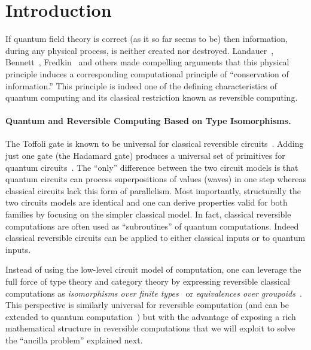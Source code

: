 \documentclass[sigplan,10pt,review,anonymous]{acmart}
\begin{document}






\section{Introduction}

If quantum field theory is correct (as it so far seems to be) then
information, during any physical process, is neither created nor
destroyed. Landauer~\cite{Landauer:1961,Landauer,bennett1985fundamental},
Bennett~\cite{bennett2010notes,bennett2003notes,Bennett:1973:LRC},
Fredkin~\cite{fredkin1982conservative} and others made compelling
arguments that this physical principle induces a corresponding
computational principle of ``conservation of information.'' This
principle is indeed one of the defining characteristics of quantum
computing and its classical restriction known as reversible computing.

\paragraph*{Quantum and Reversible Computing Based on Type
  Isomorphisms.} The Toffoli gate is known to be universal for
classical reversible circuits~\cite{Toffoli:1980}. Adding just one
gate (the Hadamard gate) produces a universal set of primitives for
quantum circuits~\cite{hadtoffuniv}. The ``only'' difference between
the two circuit models is that quantum circuits can process
superpositions of values (waves) in one step whereas classical
circuits lack this form of parallelism. Most importantly, structurally
the two circuits models are identical and one can derive properties
valid for both families by focusing on the simpler classical model. In
fact, classical reversible computations are often used as
``subroutines'' of quantum computations. Indeed classical reversible
circuits can be applied to either classical inputs or to quantum
inputs. 

Instead of using the low-level circuit model of computation,
one can leverage the full force of type theory and category theory by
expressing reversible classical computations as \emph{isomorphisms
  over finite types}~\cite{Fiore:2004,James:2012:IE:2103656.2103667}
or \emph{equivalences over
  groupoids}~\cite{DBLP:conf/esop/CaretteS16}. This perspective is
similarly universal for reversible computation (and can be extended to
quantum computation~\cite{10.1007/978-3-319-89366-2_19}) but with the
advantage of exposing a rich mathematical structure in reversible
computations that we will exploit to solve the ``ancilla problem''
explained next.
\end{document}
